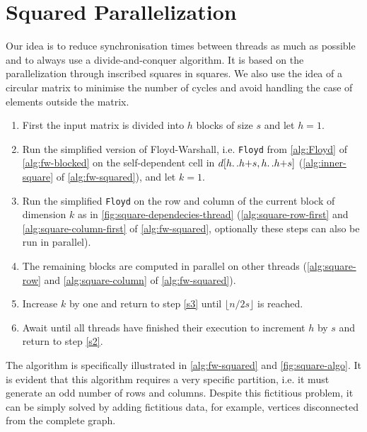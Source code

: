 \section{Squared Parallelization}\label{squared-parallelization}

Our idea is to reduce synchronisation times between threads as much as possible and to always use a divide-and-conquer algorithm. 
It is based on the parallelization through inscribed squares in squares. We also use the idea of a circular matrix to minimise the number of cycles and avoid handling the case of elements outside the matrix.


\begin{enumerate}
    \item First the input matrix is divided into \(h\) blocks of size \(s\) and let \(h=1\).
    \item \label{s2} Run the simplified version of Floyd-Warshall, i.e. \texttt{Floyd} from \cref{alg:Floyd} of \cref{alg:fw-blocked} on the self-dependent cell in \(d[h{\mathinner {\ldotp \ldotp}}h{+}s,h{\mathinner {\ldotp \ldotp}}h{+}s]\) (\cref{alg:inner-square} of \cref{alg:fw-squared}), and let \(k=1\).
    \item \label{s3} Run the simplified \texttt{Floyd} on the row and column of the current block of dimension \(k\) as in \cref{fig:square-dependecies-thread} (\cref{alg:square-row-first} and \ref{alg:square-column-first} of \cref{alg:fw-squared}, optionally these steps can also be run in parallel).
    \item The remaining blocks are computed in parallel on other threads (\cref{alg:square-row} and \ref{alg:square-column} of \cref{alg:fw-squared}).
    \item Increase \(k\) by one and return to step \ref{s3} until \(\lfloor n/2s \rfloor\) is reached.
    \item Await until all threads have finished their execution to increment \(h\) by \(s\) and return to step \ref{s2}.
\end{enumerate}
The algorithm is specifically illustrated in \cref{alg:fw-squared} and \cref{fig:square-algo}.
It is evident that this algorithm requires a very specific partition, i.e. it must generate an odd number of rows and columns. 
Despite this fictitious problem, it can be simply solved by adding fictitious data, for example, vertices disconnected from the complete graph.
